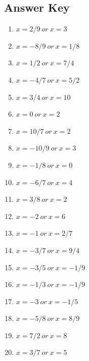 \documentclass{article}
\begin{document}
\newpage

\subsection*{Answer Key}

\begin{enumerate}
\item $\displaystyle x =2/9\ or \ x =3 $ \ 
\item $\displaystyle x =-8/9\ or \ x =1/8 $ \ 
\item $\displaystyle x =1/2\ or \ x =7/4 $ \ 
\item $\displaystyle x =-4/7\ or \ x =5/2 $ \ 
\item $\displaystyle x =3/4\ or \ x =10 $ \ 
\item $\displaystyle x =0\ or \ x =2 $ \ 
\item $\displaystyle x =10/7\ or \ x =2 $ \ 
\item $\displaystyle x =-10/9\ or \ x =3 $ \ 
\item $\displaystyle x =-1/8\ or \ x =0 $ \ 
\item $\displaystyle x =-6/7\ or \ x =4 $ \ 
\item $\displaystyle x =3/8\ or \ x =2 $ \ 
\item $\displaystyle x =-2\ or \ x =6 $ \ 
\item $\displaystyle x =-1\ or \ x =2/7 $ \ 
\item $\displaystyle x =-3/7\ or \ x =9/4 $ \ 
\item $\displaystyle x =-3/5\ or \ x =-1/9 $ \ 
\item $\displaystyle x =-1/3\ or \ x =-1/9 $ \ 
\item $\displaystyle x =-3\ or \ x =-1/5 $ \ 
\item $\displaystyle x =-5/8\ or \ x =8/9 $ \ 
\item $\displaystyle x =7/2\ or \ x =8 $ \ 
\item $\displaystyle x =3/7\ or \ x =5 $ \ 

\end{enumerate}
\end{document}
